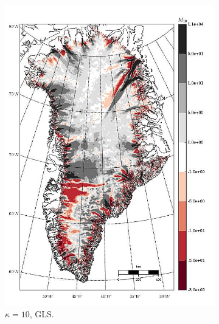 \begin{figure}
  \begin{subfigure}[b]{0.25\linewidth}
    \includegraphics[width=\linewidth]{images/balance_velocity/greenland/d_U_ob/misfit_5H_kappa_10_GLS.jpg}
  \caption{$\kappa = 10$, GLS.}
  \label{greenland_bv_image_d_U_ob_kappa_10_GLS_misfit}
  \end{subfigure}
  \begin{subfigure}[b]{0.25\linewidth}

\end{subfigure}
\end{figure}
